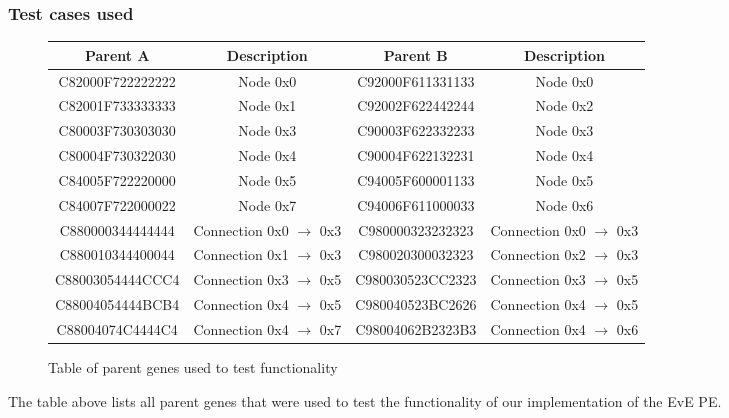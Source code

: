 \documentclass[preprint,pre,floats,aps,amsmath,amssymb]{revtex4}
\begin{document}
\subsubsection{Test cases used}
\begin {figure} [h!]
	\begin{center}
		\begin{tabular}{|c|c|c|c|}
			\hline
			Parent A& Description & Parent B & Description \\ \hline
			C82000F722222222& Node 0x0 &C92000F611331133  & Node 0x0 \\ \hline
			C82001F733333333& Node 0x1 &C92002F622442244 & Node 0x2 \\ \hline
			C80003F730303030& Node 0x3 &C90003F622332233 & Node 0x3 \\ \hline
			C80004F730322030& Node 0x4 &C90004F622132231 & Node 0x4 \\ \hline
			C84005F722220000&  Node 0x5&C94005F600001133 & Node 0x5 \\ \hline
			C84007F722000022& Node 0x7&C94006F611000033 & Node 0x6 \\ \hline
			C880000344444444& Connection 0x0  $\rightarrow$  0x3&C980000323232323 & Connection 0x0  $\rightarrow$  0x3 \\ \hline
			C880010344400044& Connection 0x1  $\rightarrow$  0x3&C980020300032323 & Connection 0x2  $\rightarrow$  0x3 \\ \hline
			C88003054444CCC4& Connection 0x3  $\rightarrow$  0x5&C980030523CC2323 & Connection 0x3  $\rightarrow$  0x5 \\ \hline
			C88004054444BCB4& Connection 0x4  $\rightarrow$  0x5&C980040523BC2626 & Connection 0x4  $\rightarrow$  0x5 \\ \hline
			C88004074C4444C4& Connection 0x4  $\rightarrow$  0x7&C98004062B2323B3 & Connection 0x4  $\rightarrow$  0x6 \\ \hline
		\end{tabular}
	\end{center}
	\caption{Table of parent genes used to test functionality}
\end{figure}
\FloatBarrier
The table above lists all parent genes that were used to test the functionality of our implementation of the EvE PE.
\end{document}
